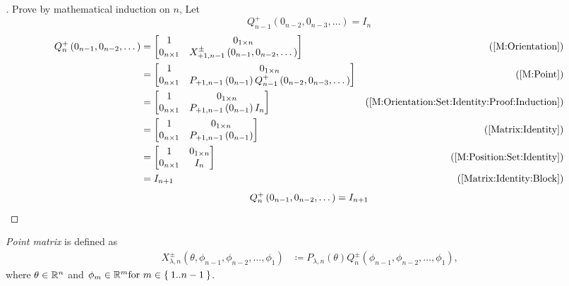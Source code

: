\documentclass[../main.tex]{subfiles}
\begin{document}
\begin{proof}[]
Prove by mathematical induction on \(n\),
Let
\begin{equation}\label{M:Orientation:Set:Identity:Proof:Induction}
Q^{+}_{n-1}\left(0_{n-2}, 0_{n-3},\dots\right)=I_n
\end{equation}
\begin{align*}
Q^{+}_n\left(0_{n-1}, 0_{n-2},\dots\right)
&=
\begin{bmatrix}
1&0_{1\times n}\\
0_{n\times 1}&X^{\pm}_{+1,n-1}\left(0_{n-1},0_{n-2},\dots\right)\\
\end{bmatrix}
&\text{(\cref{M:Orientation})}\\
&=
\begin{bmatrix}
1&0_{1\times n}\\
0_{n\times 1}&P_{+1,n-1}\left(0_{n-1}\right)Q^{+}_{n-1}\left(0_{n-2}, 0_{n-3},\dots\right)\\
\end{bmatrix}
&\text{(\cref{M:Point})}\\
&=
\begin{bmatrix}
1&0_{1\times n}\\
0_{n\times 1}&P_{+1,n-1}\left(0_{n-1}\right) I_n\\
\end{bmatrix}
&\text{(\cref{M:Orientation:Set:Identity:Proof:Induction})}\\
&=
\begin{bmatrix}
1&0_{1\times n}\\
0_{n\times 1}&P_{+1,n-1}\left(0_{n-1}\right)\\
\end{bmatrix}
&\text{(\cref{Matrix:Identity})}\\
&=
\begin{bmatrix}
1&0_{1\times n}\\
0_{n\times 1}&I_{n}\\
\end{bmatrix}
&\text{(\cref{M:Position:Set:Identity})}\\
&=
I_{n+1}
&\text{(\cref{Matrix:Identity:Block})}
\end{align*}
\[
Q^{+}_n
\left(0_{n-1}, 0_{n-2},\dots\right)
=
I_{n+1}
\qedhere
\]
\end{proof}
\begin{definition}\label{M:Point}
\textit{Point matrix} is defined as
\begin{align*}
X^{\pm}_{\lambda,n}\left(\theta,\phi_{n-1},\phi_{n-2},\dots,\phi_1\right)&\coloneqq
P_{\lambda,n}\left(\theta\right)
Q^{\pm}_n\left(\phi_{n-1},\phi_{n-2},\dots,\phi_1\right)\text{,}
\end{align*}
where \(\theta\in\mathbb{R}^n\) and \(\phi_m\in\mathbb{R}^m\text{for } m\in\Set{1..n-1}\).
\end{definition}
\end{document}
